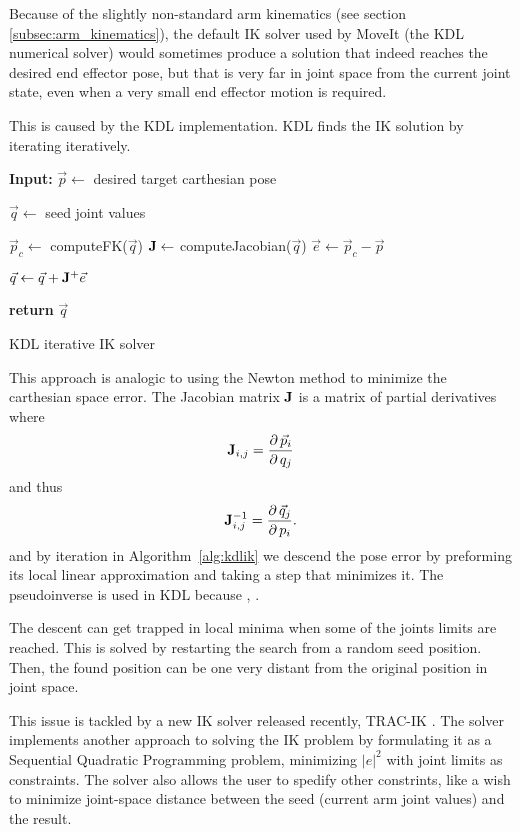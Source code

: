 \documentclass[buriama8_dp.tex]{subfiles}
\begin{document}
Because of the slightly non-standard arm kinematics (see section \ref{subsec:arm_kinematics}), the default IK solver used by MoveIt (the KDL numerical solver) would sometimes produce a solution that indeed reaches the desired end effector pose, but that is very far in joint space from the current joint state, even when a very small end effector motion is required.


This is caused by the KDL implementation. KDL finds the IK solution by iterating iteratively.

\begin{algorithm}[htp]
\begin{algorithmic}
  \State \textbf{Input:} \(\vec p \gets\) desired target carthesian pose
  \vspace{1em}

  \State \(\vec q \gets\) seed joint values
 
  \Do
    \State \(\vec p_c \gets\) computeFK(\(\vec q\))
    \State \(\mathbf{J} \gets\) computeJacobian(\(\vec q\))
    \State \(\vec e \gets \vec p_c - \vec p\)

    \State \(\vec q \gets \vec q + \mathbf{J}^+ \vec e \)

  \vspace{1em}
  \State \textbf{return} \(\vec q\)
\end{algorithmic}
\caption{KDL iterative IK solver}
\label{alg:kdlik}
\end{algorithm}

This approach is analogic to using the Newton method to minimize the carthesian space error. The Jacobian matrix \(\mathbf{J}\) is a matrix of partial derivatives where
\[
\mathbf{J}_{i,j} = \frac{\partial\,{\vec p_i}}{\partial\, q_j}
\]
and thus
\[
\mathbf{J}_{i,j}^{-1} = \frac{\partial\,{\vec q_j}}{\partial\, p_i}.
\]
and by iteration in Algorithm~\ref{alg:kdlik} we descend the pose error by preforming its local linear approximation and taking a step that minimizes it. The pseudoinverse is used in KDL because , .

The descent can get trapped in local minima when some of the joints limits are reached. This is solved by restarting the search from a random seed position. Then, the found position can be one very distant from the original position in joint space.

This issue is tackled by a new IK solver released recently, TRAC-IK \cite{tracik}. The solver implements another approach to solving the IK problem by formulating it as a Sequential Quadratic Programming problem, minimizing \(|e|^2\) with joint limits as constraints. The solver also allows the user to spedify other constrints, like a wish to minimize joint-space distance between the seed (current arm joint values) and the result.
\end{document}
